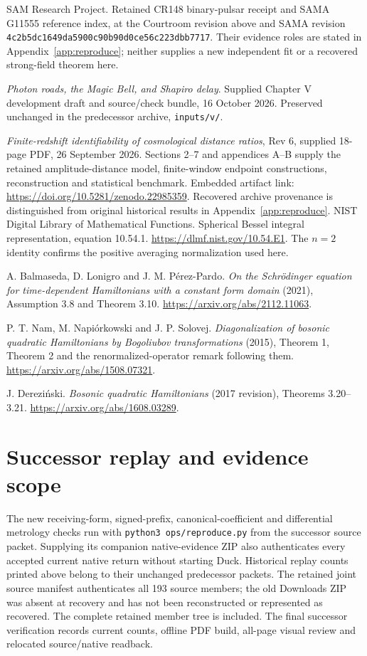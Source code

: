 \documentclass[10pt,twocolumn,letterpaper]{article}
\begin{document}
\noindent[17] SAM Research Project. Retained CR148 binary-pulsar receipt and SAMA G11555 reference index, at the Courtroom revision above and SAMA revision \nolinkurl{4c2b5dc1649da5900c90b90d0ce56c223dbb7717}. Their evidence roles are stated in Appendix~\ref{app:reproduce}; neither supplies a new independent fit or a recovered strong-field theorem here.

\noindent[18] \emph{Photon roads, the Magic Bell, and Shapiro delay}. Supplied Chapter V development draft and source/check bundle, 16 October 2026. Preserved unchanged in the predecessor archive, \texttt{inputs/v/}.

\noindent[19] \emph{Finite-redshift identifiability of cosmological distance ratios}, Rev 6, supplied 18-page PDF, 26 September 2026. Sections 2--7 and appendices A--B supply the retained amplitude-distance model, finite-window endpoint constructions, reconstruction and statistical benchmark. Embedded artifact link: \url{https://doi.org/10.5281/zenodo.22985359}. Recovered archive provenance is distinguished from original historical results in Appendix~\ref{app:reproduce}.
\noindent[20] NIST Digital Library of Mathematical Functions. Spherical Bessel integral representation, equation 10.54.1. \url{https://dlmf.nist.gov/10.54.E1}. The $n=2$ identity confirms the positive averaging normalization used here.


\noindent[21] A. Balmaseda, D. Lonigro and J. M. P\'erez-Pardo.
\emph{On the Schr\"odinger equation for time-dependent Hamiltonians with
a constant form domain} (2021), Assumption 3.8 and Theorem 3.10.
\url{https://arxiv.org/abs/2112.11063}.

\noindent[22] P. T. Nam, M. Napi\'orkowski and J. P. Solovej.
\emph{Diagonalization of bosonic quadratic Hamiltonians by Bogoliubov
transformations} (2015), Theorem 1, Theorem 2 and the renormalized-operator
remark following them. \url{https://arxiv.org/abs/1508.07321}.


\noindent[23] J. Derezi\'nski. \emph{Bosonic quadratic Hamiltonians}
(2017 revision), Theorems 3.20--3.21.
\url{https://arxiv.org/abs/1608.03289}.
\par\endgroup

\section*{Successor replay and evidence scope}
The new receiving-form, signed-prefix, canonical-coefficient and differential
metrology checks run with \texttt{python3 ops/reproduce.py} from the successor
source packet. Supplying its companion native-evidence ZIP also authenticates
every accepted current native return without starting Duck. Historical replay
counts printed above belong to their unchanged predecessor packets.
The retained joint source manifest authenticates all 193 source members;
the old Downloads ZIP was absent at recovery and has not been reconstructed
or represented as recovered. The complete retained member tree is included.
The final successor verification records current counts, offline PDF build,
all-page visual review and relocated source/native readback.
\end{document}
